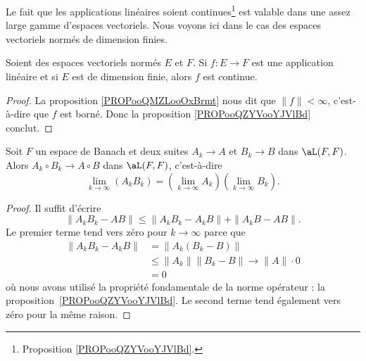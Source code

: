 Le fait que les applications linéaires soient continues\footnote{Proposition \ref{PROPooQZYVooYJVlBd}.} est valable dans une assez large gamme d'espaces vectoriels\cite{BIBooUWMLooWEPxcC}. Nous voyons ici dans le cas des espaces vectoriels normés de dimension finies.
\begin{proposition}     \label{PROPooADPDooOtukQP}
	Soient des espaces vectoriels normés \( E\) et \( F\). Si \( f\colon E\to F\) est une application linéaire et si \( E\) est de dimension finie, alors \( f\) est continue.
\end{proposition}

\begin{proof}
	La proposition \ref{PROPooQMZLooOxBrmt} nous dit que \( \| f \|<\infty\), c'est-à-dire que \( f\) est borné. Donc la proposition \ref{PROPooQZYVooYJVlBd} conclut.
\end{proof}


\begin{lemma}   \label{LemWWXVSae}
	Soit \( F\) un espace de Banach et deux suites \( A_k\to A\) et \( B_k\to B\) dans \( \aL(F,F)\). Alors \( A_k\circ B_k\to A\circ B\) dans \( \aL(F,F)\), c'est-à-dire
	\begin{equation}
		\lim_{k\to \infty} (A_kB_k)=\left( \lim_{k\to \infty} A_k \right)\left( \lim_{k\to \infty} B_k \right).
	\end{equation}
\end{lemma}

\begin{proof}
	Il suffit d'écrire
	\begin{equation}
		\| A_kB_k-AB \|\leq \| A_kB_k-A_kB \|+\| A_kB-AB \|.
	\end{equation}
	Le premier terme tend vers zéro pour \( k\to\infty\) parce que
	\begin{subequations}
		\begin{align}
			\| A_kB_k-A_kB \| & =\| A_k(B_k-B) \|                           \\
			                  & \leq \| A_k \|\| B_k-B \|\to \| A \|\cdot 0 \\
			                  & =0
		\end{align}
	\end{subequations}
	où nous avons utilisé la propriété fondamentale de la norme opérateur : la proposition~\ref{PROPooQZYVooYJVlBd}. Le second terme tend également vers zéro pour la même raison.
\end{proof}

